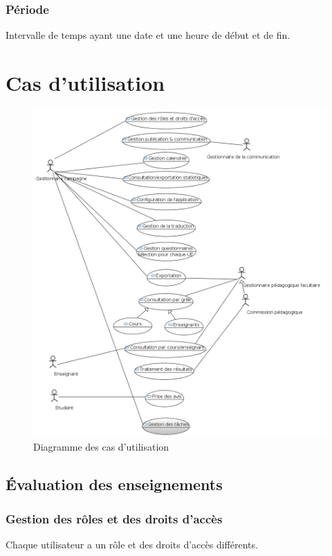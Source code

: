 \documentclass[a4paper,11pt]{report}
\begin{document}
\subsection{Période}
Intervalle de temps ayant une date et une heure de début et de fin.

\chapter{Cas d'utilisation}
\begin{figure}[ht]
\includegraphics[width=\linewidth]{UseCase_Diagram.PNG}
\caption{Diagramme des cas d'utilisation}
\label{fig:usecase-diag}
\end{figure}

\section{Évaluation des enseignements}

\subsection{Gestion des rôles et des droits d'accès}
Chaque utilisateur a un rôle et des droits d'accès différents.
\end{document}
